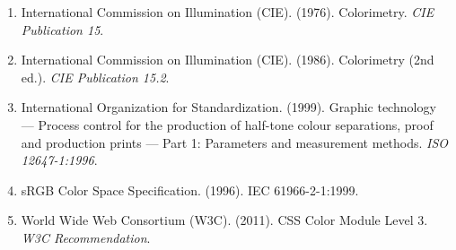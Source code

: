 \begin{enumerate}[resume]

\item International Commission on Illumination (CIE). (1976). Colorimetry. \textit{CIE Publication 15}.

\item International Commission on Illumination (CIE). (1986). Colorimetry (2nd ed.). \textit{CIE Publication 15.2}.

\item International Organization for Standardization. (1999). Graphic technology — Process control for the production of half-tone colour separations, proof and production prints — Part 1: Parameters and measurement methods. \textit{ISO 12647-1:1996}.

\item sRGB Color Space Specification. (1996). IEC 61966-2-1:1999.

\item World Wide Web Consortium (W3C). (2011). CSS Color Module Level 3. \textit{W3C Recommendation}.

\end{enumerate}
